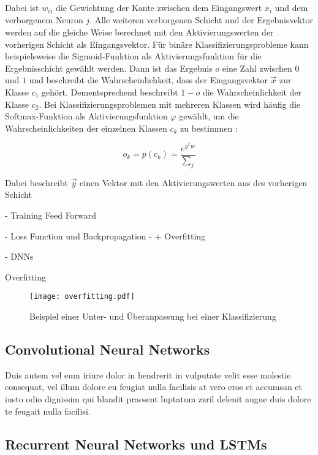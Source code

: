 Dabei ist $w_{ij}$ die Gewichtung der Kante zwischen dem Eingangswert $x_i$ und dem verborgenem Neuron $j$. Alle weiteren verborgenen Schicht und der Ergebnisvektor werden auf die gleiche Weise berechnet mit den Aktivierungswerten der vorherigen Schicht als Eingangsvektor. Für binäre Klassifizierungsprobleme kann beispielsweise die Sigmoid-Funktion als Aktivierungsfunktion für die Ergebnisschicht gewählt werden. Dann ist das Ergebnis $o$ eine Zahl zwischen $0$ und $1$ und beschreibt die Wahrscheinlichkeit, dass der Eingangsvektor $\vec{x}$ zur Klasse $c_1$ gehört. Dementsprechend beschreibt $1-o$ die Wahrscheinlichkeit der Klasse $c_2$. Bei Klassifizierungsproblemen mit mehreren Klassen wird häufig die Softmax-Funktion als Aktivierungsfunktion $\varphi$ gewählt, um die Wahrscheinlichkeiten der einzelnen Klassen $c_k$ zu bestimmen \cite{bridle1990probabilistic}:

\begin{equation}
o_k = p(c_k) = \frac{e^{y^Tw}}{\sum_j{}}
\end{equation}

Dabei beschreibt $\vec{y}$ einen Vektor mit den Aktivierungswerten aus des vorherigen Schicht



- Training Feed Forward

- Loss Function und Backpropagation
- + Overfitting

- DNNs


Overfitting

\begin{figure}[h]
\centering
\texttt{[image: overfitting.pdf]}
\caption{Beispiel einer Unter- und Überanpassung bei einer Klassifizierung}
\label{fig_overfitting}
\end{figure}


\subsection{Convolutional Neural Networks}
\label{grundlagen_nn_cnn}

Duis autem vel eum iriure dolor in hendrerit in vulputate velit esse molestie consequat, vel illum dolore eu feugiat nulla facilisis at vero eros et accumsan et iusto odio dignissim qui blandit praesent luptatum zzril delenit augue duis dolore te feugait nulla facilisi. 


\subsection{Recurrent Neural Networks und LSTMs}
\label{grundlagen_nn_rnn}

